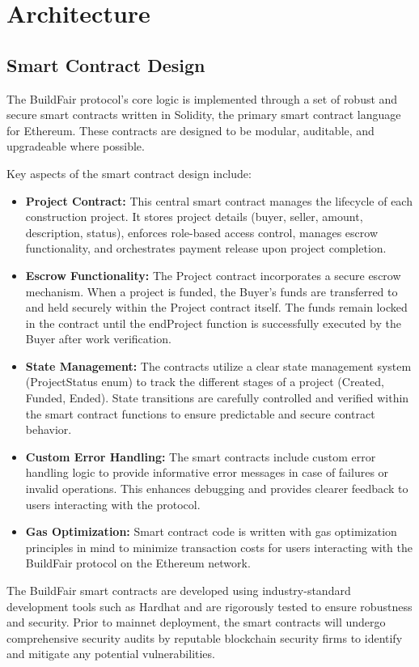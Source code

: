 \documentclass[12pt]{article}
\begin{document}
\section{Architecture}
\subsection{Smart Contract Design}
The BuildFair protocol's core logic is implemented through a set of robust and secure smart contracts written in Solidity, the primary smart contract language for Ethereum. These contracts are designed to be modular, auditable, and upgradeable where possible.

Key aspects of the smart contract design include:

\begin{itemize}
    \item \textbf{Project Contract:} This central smart contract manages the lifecycle of each construction project. It stores project details (buyer, seller, amount, description, status), enforces role-based access control, manages escrow functionality, and orchestrates payment release upon project completion.
    \item \textbf{Escrow Functionality:} The Project contract incorporates a secure escrow mechanism. When a project is funded, the Buyer's funds are transferred to and held securely within the Project contract itself. The funds remain locked in the contract until the endProject function is successfully executed by the Buyer after work verification.
    \item \textbf{State Management:} The contracts utilize a clear state management system (ProjectStatus enum) to track the different stages of a project (Created, Funded, Ended). State transitions are carefully controlled and verified within the smart contract functions to ensure predictable and secure contract behavior.
    \item \textbf{Custom Error Handling:} The smart contracts include custom error handling logic to provide informative error messages in case of failures or invalid operations. This enhances debugging and provides clearer feedback to users interacting with the protocol.
    \item \textbf{Gas Optimization:} Smart contract code is written with gas optimization principles in mind to minimize transaction costs for users interacting with the BuildFair protocol on the Ethereum network.
\end{itemize}

The BuildFair smart contracts are developed using industry-standard development tools such as Hardhat and are rigorously tested to ensure robustness and security. Prior to mainnet deployment, the smart contracts will undergo comprehensive security audits by reputable blockchain security firms to identify and mitigate any potential vulnerabilities.
\end{document}

